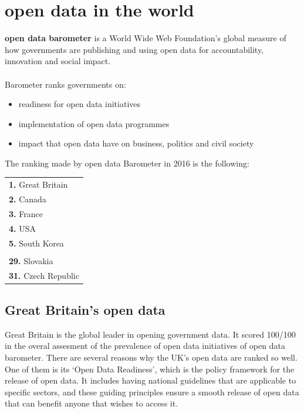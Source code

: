 \documentclass[thesis=B,english]{FITthesis}[2012/06/26]
\begin{document}
	\section{open data in the world}
	\label{worldopendata}
	\textbf{open data barometer} is a World Wide Web Foundation's global measure of how governments are publishing and using open data for accountability, innovation and social impact.\cite{opendatabarometer} \paragraph{} Barometer ranks governments on:
\begin{itemize}
	\item readiness for open data initiatives
	\item implementation of open data programmes
	\item impact that open data have on business, politics and civil society
\end{itemize}
The ranking made by open data Barometer in 2016 is the following:
\begin{center}
\begin{tabular}{l}
  \textbf{1.} Great Britain \\
  \textbf{2.} Canada \\
  \textbf{3.} France \\
  \textbf{4.} USA \\
  \textbf{5.} South Korea \\
  \\
  \textbf{29.} Slovakia \\
  \textbf{31.} Czech Republic \\
\end{tabular}
\end{center}
  \subsection{Great Britain's open data}
  Great Britain is the global leader in opening government data. It scored 100/100 in the overal assesment of the prevalence of open data initiatives of open data barometer.
  There are several reasons why the UK's open data are ranked so well. One of them is its ‘Open Data Readiness’, which is the policy framework for the release of open data. It includes having national guidelines that are applicable to specific sectors, and these guiding principles ensure a smooth release of open data that can benefit anyone that wishes to access it.
\end{document}

